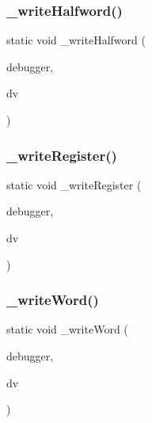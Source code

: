 \subsubsection{\texorpdfstring{\+\_\+write\+Halfword()}{\_writeHalfword()}}
{\footnotesize\ttfamily static void \+\_\+write\+Halfword (\begin{DoxyParamCaption}\item[{struct C\+L\+I\+Debugger $\ast$}]{debugger,  }\item[{struct C\+L\+I\+Debug\+Vector $\ast$}]{dv }\end{DoxyParamCaption})\hspace{0.3cm}{\ttfamily [static]}}

\mbox{\label{debugger_2cli-debugger_8c_aea6200b640b85462b66907e252c9b7cd}} 
\subsubsection{\texorpdfstring{\+\_\+write\+Register()}{\_writeRegister()}}
{\footnotesize\ttfamily static void \+\_\+write\+Register (\begin{DoxyParamCaption}\item[{struct C\+L\+I\+Debugger $\ast$}]{debugger,  }\item[{struct C\+L\+I\+Debug\+Vector $\ast$}]{dv }\end{DoxyParamCaption})\hspace{0.3cm}{\ttfamily [static]}}

\mbox{\label{debugger_2cli-debugger_8c_aff03320d22a8e46d1af7c43cb84919da}} 
\subsubsection{\texorpdfstring{\+\_\+write\+Word()}{\_writeWord()}}
{\footnotesize\ttfamily static void \+\_\+write\+Word (\begin{DoxyParamCaption}\item[{struct C\+L\+I\+Debugger $\ast$}]{debugger,  }\item[{struct C\+L\+I\+Debug\+Vector $\ast$}]{dv }\end{DoxyParamCaption})\hspace{0.3cm}{\ttfamily [static]}}

